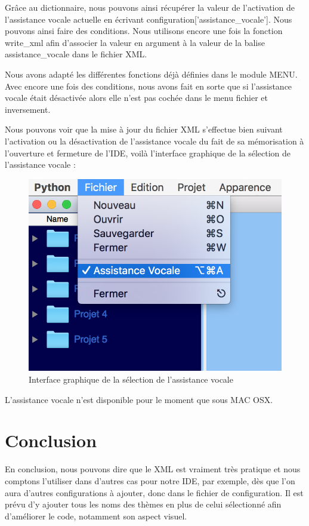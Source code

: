 \documentclass[a4paper,12pt]{article}
\begin{document}
Grâce au dictionnaire, nous pouvons ainsi récupérer la valeur de l'activation de l'assistance vocale actuelle en écrivant configuration['assistance\_vocale']. Nous pouvons ainsi faire des conditions. Nous utilisons encore une fois la fonction write\_xml afin d'associer la valeur en argument à la valeur de la balise assistance\_vocale dans le fichier XML. 

Nous avons adapté les différentes fonctions déjà définies dans le module MENU. Avec encore une fois des conditions, nous avons fait en sorte que si l'assistance vocale était désactivée alors elle n'est pas cochée dans le menu fichier et inversement.

Nous pouvons voir que la mise à jour du fichier XML s'effectue bien suivant l'activation ou la désactivation de l'assistance vocale du fait de sa mémorisation à l'ouverture et fermeture de l'IDE, voilà l'interface graphique de la sélection de l'assistance vocale : 

\begin{figure}[h!]
			\begin{center}
				\includegraphics[scale=0.5]{images/assistance_vocale.png}
				\caption{Interface graphique de la sélection de l'assistance vocale}
			\end{center}
		\end{figure}
		
L'assistance vocale n'est disponible pour le moment que sous MAC OSX.
		
\section{Conclusion}

En conclusion, nous pouvons dire que le XML est vraiment très pratique et nous comptons l'utiliser dans d'autres cas pour notre IDE, par exemple, dès que l'on aura d'autres configurations à ajouter, donc dans le fichier de configuration. Il est prévu d'y ajouter tous les noms des thèmes en plus de celui sélectionné afin d'améliorer le code, notamment son aspect visuel.
		
\end{document}
